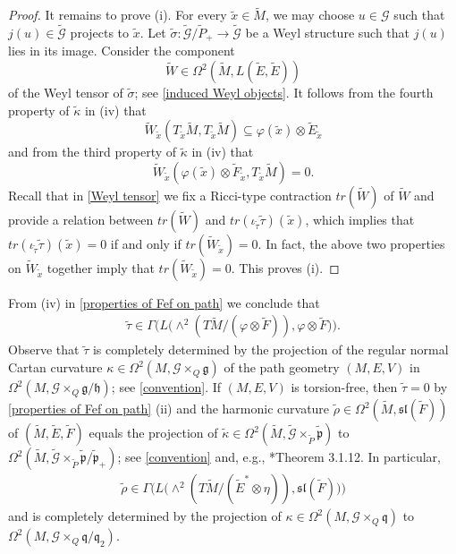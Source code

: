 \documentclass[11pt]{amsart}
\begin{document}
\begin{proof}
It remains to prove (i). For every $\tilde x\in\tilde M$, we may choose $u\in\mathcal G$ such that $j(u)\in\tilde{\mathcal G}$ projects to $\tilde x$. Let $\tilde\sigma:\tilde{\mathcal G}/\tilde P_+\to\tilde{\mathcal G}$ be a Weyl structure such that $j(u)$ lies in its image. Consider the component
\[\tilde W
\in\Omega^2(\tilde M,L(\tilde E,\tilde E))\]
of the Weyl tensor of $\tilde\sigma$; see \eqref{induced Weyl objects}. It follows from the fourth property of $\tilde\kappa$ in (iv) that
\[\tilde W_{\tilde x}(T_{\tilde x}\tilde M,T_{\tilde x}\tilde M)\subseteq \varphi(\tilde x)\otimes\tilde E_{\tilde x}\]
and from the third property of $\tilde\kappa$ in (iv) that 
\[\tilde W_{\tilde x}(\varphi(\tilde x)\otimes\tilde F_{\tilde x},T_{\tilde x}\tilde M)=0.\]
Recall that in \cref{Weyl tensor} we fix a Ricci-type contraction $tr(\tilde W)$ of $\tilde W$ and provide a relation between $tr(\tilde W)$ and $tr(\iota_{\tilde\tau}\tilde\tau)(\tilde x)$, which implies that $tr(\iota_{\tilde\tau}\tilde\tau)(\tilde x)=0$ if and only if $tr(\tilde W_{\tilde x})=0$. In fact, the above two properties on $\tilde W_{\tilde x}$ together imply that $tr(\tilde W_{\tilde x})=0$. This proves (i).
\end{proof}
From (iv) in \cref{properties of Fef on path} we conclude that
\begin{align}
\tilde\tau\in\Gamma\big(L\big(\wedge^2(T\tilde M/(\varphi\otimes\tilde F)),\varphi\otimes\tilde F\big)\big).  
\end{align}
Observe that $\tilde\tau$ is completely determined by the projection of the regular normal Cartan curvature $\kappa\in\Omega^2(M,\mathcal G\times_Q\mathfrak g)$ of the path geometry $(M,E,V)$ in $\Omega^2(M,\mathcal G\times_Q\mathfrak g/\mathfrak h)$; see \cref{convention}. If $(M,E,V)$ is torsion-free, then $\tilde\tau=0$ by \cref{properties of Fef on path} (ii) and the harmonic curvature $\tilde\rho\in\Omega^2(\tilde M,\mathfrak{sl}(\tilde F))$ of $(\tilde M,\tilde E,\tilde F)$ equals the projection of $\tilde\kappa\in\Omega^2(\tilde M,\tilde{\mathcal G}\times_{\tilde P}\tilde{\mathfrak p})$ to $\Omega^2(\tilde M,\tilde{\mathcal G}\times_{\tilde P}\tilde{\mathfrak p}/\tilde{\mathfrak p}_+)$; see \cref{convention} and, e.g., \cite{Book}*{Theorem 3.1.12}. In particular, 
\begin{align}
\tilde\rho\in\Gamma\big(L\big(\wedge^2(T\tilde M/(\tilde E^*\otimes\eta)),\mathfrak{sl}(\tilde F)\big)\big)
\end{align}
and is completely determined by the projection of $\kappa\in\Omega^2(M,\mathcal G\times_Q\mathfrak q)$ to $\Omega^2(M,\mathcal G\times_Q\mathfrak q/\mathfrak q_2)$.
\end{document}
